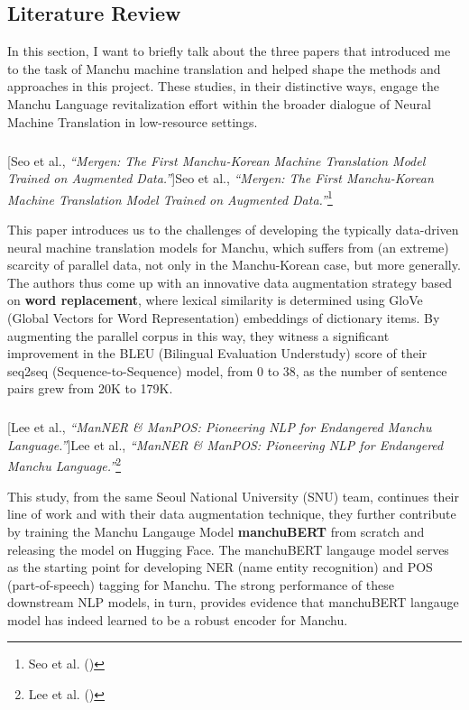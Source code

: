 \documentclass[
  letterpaper,
  DIV=11,
  numbers=noendperiod]{scrartcl}
\makeatletter
\let\oldsubparagraph\subparagraph
\renewcommand{\subparagraph}{
    \@ifstar
      \xxxSubParagraphStar
      \xxxSubParagraphNoStar
  }
\newcommand{\xxxSubParagraphStar}[1]{\oldsubparagraph*{#1}\mbox{}}
\newcommand{\xxxSubParagraphNoStar}[1]{\oldsubparagraph{#1}\mbox{}}
\makeatother
\begin{document}
\subsection{Literature Review}\label{literature-review}

In this section, I want to briefly talk about the three papers that
introduced me to the task of Manchu machine translation and helped shape
the methods and approaches in this project. These studies, in their
distinctive ways, engage the Manchu Language revitalization effort
within the broader dialogue of Neural Machine Translation in
low-resource settings.

\subparagraph[Seo et al., \emph{``Mergen: The First Manchu-Korean
Machine Translation Model Trained on Augmented
Data.''}]{\texorpdfstring{Seo et al., \emph{``Mergen: The First
Manchu-Korean Machine Translation Model Trained on Augmented
Data.''}\footnote{Seo et al.
  ()}}{Seo et al., ``Mergen: The First Manchu-Korean Machine Translation Model Trained on Augmented Data.''}}\label{seo-et-al.-mergen-the-first-manchu-korean-machine-translation-model-trained-on-augmented-data.}

This paper introduces us to the challenges of developing the typically
data-driven neural machine translation models for Manchu, which suffers
from (an extreme) scarcity of parallel data, not only in the
Manchu-Korean case, but more generally. The authors thus come up with an
innovative data augmentation strategy based on \textbf{word
replacement}, where lexical similarity is determined using GloVe (Global
Vectors for Word Representation) embeddings of dictionary items. By
augmenting the parallel corpus in this way, they witness a significant
improvement in the BLEU (Bilingual Evaluation Understudy) score of their
seq2seq (Sequence-to-Sequence) model, from 0 to 38, as the number of
sentence pairs grew from 20K to 179K.

\subparagraph[Lee et al., \emph{``ManNER \& ManPOS: Pioneering NLP for
Endangered Manchu Language.''}]{\texorpdfstring{Lee et al.,
\emph{``ManNER \& ManPOS: Pioneering NLP for Endangered Manchu
Language.''}\footnote{Lee et al.
  ()}}{Lee et al., ``ManNER \& ManPOS: Pioneering NLP for Endangered Manchu Language.''}}\label{lee-et-al.-manner-manpos-pioneering-nlp-for-endangered-manchu-language.}

This study, from the same Seoul National University (SNU) team,
continues their line of work and with their data augmentation technique,
they further contribute by training the Manchu Langauge Model
\textbf{manchuBERT} from scratch and releasing the model on Hugging
Face. The manchuBERT langauge model serves as the starting point for
developing NER (name entity recognition) and POS (part-of-speech)
tagging for Manchu. The strong performance of these downstream NLP
models, in turn, provides evidence that manchuBERT langauge model has
indeed learned to be a robust encoder for Manchu.
\end{document}
